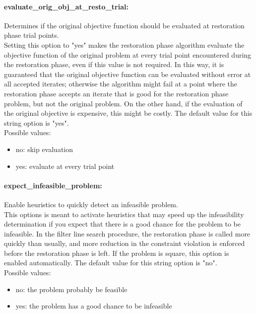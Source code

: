 \paragraph{evaluate\_orig\_obj\_at\_resto\_trial:}\label{opt:evaluate_orig_obj_at_resto_trial} Determines if the original objective function should be evaluated at restoration phase trial points. \\
 Setting this option to "yes" makes the restoration phase algorithm evaluate the objective function of the original problem at every trial point encountered during the restoration phase, even if this value is not required.  In this way, it is guaranteed that the original objective function can be evaluated without error at all accepted iterates; otherwise the algorithm might fail at a point where the restoration phase accepts an iterate that is good for the restoration phase problem, but not the original problem.  On the other hand, if the evaluation of the original objective is expensive, this might be costly. The default value for this string option is "yes".
\\ 
Possible values:
\begin{itemize}
   \item no: skip evaluation
   \item yes: evaluate at every trial point
\end{itemize}

\paragraph{expect\_infeasible\_problem:}\label{opt:expect_infeasible_problem} Enable heuristics to quickly detect an infeasible problem. \\
 This options is meant to activate heuristics that may speed up the infeasibility determination if you expect that there is a good chance for the problem to be infeasible.  In the filter line search procedure, the restoration phase is called more quickly than usually, and more reduction in the constraint violation is enforced before the restoration phase is left. If the problem is square, this option is enabled automatically. The default value for this string option is "no".
\\ 
Possible values:
\begin{itemize}
   \item no: the problem probably be feasible
   \item yes: the problem has a good chance to be infeasible
\end{itemize}

